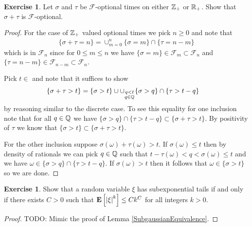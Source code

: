 \documentclass{amsart}
\theoremstyle{remark}
\theoremstyle{definition}
\newtheorem{ex}[thm]{Exercise}
\begin{document}
\begin{ex}\label{SumOfOptionalTimes}Let $\sigma$ and $\tau$ be $\mathcal{F}$-optional times on
  either $\mathbb{Z}_+$ or $\mathbb{R}_+$.
  Show that $\sigma + \tau$ is $\mathcal{F}$-optional.
\end{ex}
\begin{proof}
For the case of $\mathbb{Z}_+$ valued optional times we pick $n \geq 0$
and note that
\begin{align*}
\lbrace \sigma + \tau = n \rbrace = \cup_{m=0}^n \lbrace \sigma = m
\rbrace \cap \lbrace \tau = n-m \rbrace
\end{align*}
which is in $\mathcal{F}_n$ since for $0 \leq m \leq n$ we have
$\lbrace \sigma = m \rbrace \in \mathcal{F}_m \subset \mathcal{F}_n$
and $\lbrace \tau = n - m \rbrace \in \mathcal{F}_{n-m} \subset
\mathcal{F}_n$.

Pick $t \in $ and note that it suffices to show
\begin{align*}
\lbrace \sigma + \tau > t \rbrace &= \lbrace \sigma > t \rbrace \cup \cup_{\substack{q < t \\ q \in
    \mathbb{Q}}} \lbrace \sigma > q \rbrace \cap \lbrace \tau > t - q \rbrace
\end{align*}
by reasoning similar to the discrete case.  To see this equality for
one inclusion note
that for all $q \in \mathbb{Q}$ we have $\lbrace \sigma > q \rbrace
\cap \lbrace \tau > t - q \rbrace \subset \lbrace \sigma + \tau > t
\rbrace$.  By positivity of $\tau$ we know that $ \lbrace \sigma > t
\rbrace \subset \lbrace \sigma + \tau > t \rbrace $.

For the other inclusion suppose $\sigma(\omega) + \tau(\omega) > t$.
If $\sigma(\omega) \leq t$ then by density of rationals we can pick $q \in
\mathbb{Q}$ such that $t - \tau(\omega) < q < \sigma(\omega) \leq t$ and
we have $\omega \in \lbrace \sigma > q \rbrace \cap \lbrace \tau > t -
q\rbrace$.  If $\sigma(\omega) > t$ then it follows that $\omega \in
\lbrace \sigma > t \rbrace$ so we are done.
\end{proof}

\begin{ex}Show that a random variable $\xi$ has subexponential tails
  if and only if there exists $C > 0$ such that
  $\textbf{E}\left[\left \vert \xi \right \vert^k\right] \leq C k^C$ for all integers $k > 0$.
\end{ex}
\begin{proof}
TODO: Mimic the proof of Lemma \ref{SubgaussianEquivalence}.
\end{proof}
\end{document}
